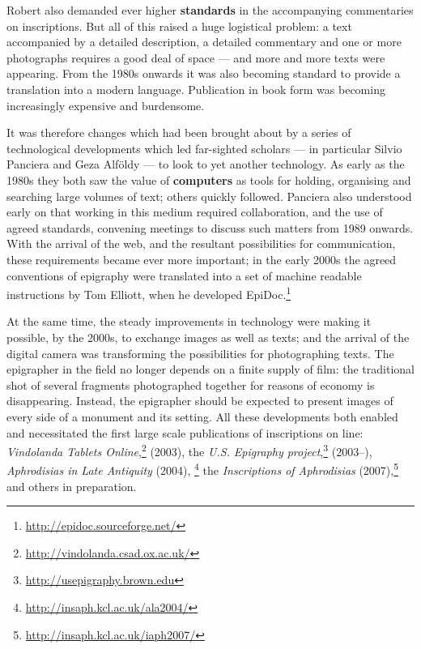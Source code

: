 \documentclass[amsthm,ebook]{saparticle}
\begin{document}
Robert also demanded ever higher \textbf{standards} in the accompanying commentaries on inscriptions. But all of this raised a
huge logistical problem: a text accompanied by a detailed description, a detailed commentary and one or more
photographs requires a good deal of space --- and more and more texts were appearing. From the 1980s onwards it was also
becoming standard to provide a translation into a modern language. Publication in book form was becoming increasingly
expensive and burdensome.


It was therefore changes which had been brought about by a series of technological developments which led far-sighted
scholars --- in particular Silvio Panciera and Geza Alföldy --- to look to yet another technology. As early as the 1980s
they both saw the value of \textbf{computers} as tools for holding, organising and searching large volumes of text; others
quickly followed. Panciera also understood early on that working in this medium required collaboration, and the use of
agreed standards, convening meetings to discuss such matters from 1989 onwards. With the arrival of the web, and the
resultant possibilities for communication, these requirements became ever more important; in the early 2000s the agreed
conventions of epigraphy were translated into a set of machine readable instructions by Tom Elliott, when he developed
EpiDoc.\footnote{ \url{http://epidoc.sourceforge.net/}} 


At the same time, the steady improvements in technology were making it possible, by the 2000s, to exchange images as
well as texts; and the arrival of the digital camera was transforming the possibilities for photographing texts. The
epigrapher in the field no longer depends on a finite supply of film: the traditional shot of several fragments
photographed together for reasons of economy is disappearing. Instead, the epigrapher should be expected to present
images of every side of a monument and its setting. All these developments both enabled and necessitated the first
large scale publications of inscriptions on line: \emph{Vindolanda Tablets Online},\footnote{
\url{http://vindolanda.csad.ox.ac.uk/}} (2003), the \emph{U.S. Epigraphy project},\footnote{ \url{http://usepigraphy.brown.edu}} (2003–),
\emph{Aphrodisias in Late Antiquity} (2004), \footnote{ \url{http://insaph.kcl.ac.uk/ala2004/}} the \emph{Inscriptions of Aphrodisias}
(2007),\footnote{ \url{http://insaph.kcl.ac.uk/iaph2007/}} and others in preparation.
\end{document}
